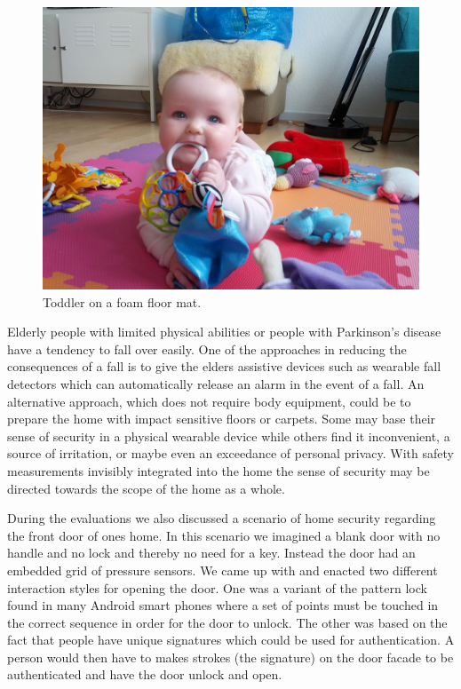 \begin{figure}[h]
  \centering
  \begin{minipage}[b]{.8\textwidth}
    \centering
    \includegraphics[width=.7\linewidth]{figures/touch/evaluation/softtiles}
  \caption[Toddler on a foam floor mat with puzzle-like tiles for extensibility.]
  {Toddler on a foam floor mat.}
  \label{fig:textiletouch:eval:softtiles}
  \end{minipage}
\end{figure}

Elderly people with limited physical abilities or people with Parkinson's disease have a tendency to fall over easily.
One of the approaches in reducing the consequences of a fall is to give the elders assistive devices such as wearable fall detectors which can automatically release an alarm in the event of a fall.
An alternative approach, which does not require body equipment, could be to prepare the home with impact sensitive floors or carpets.
Some may base their sense of security in a physical wearable device while others find it inconvenient, a source of irritation, or maybe even an exceedance of personal privacy. 
With safety measurements invisibly integrated into the home the sense of security may be directed towards the scope of the home as a whole.

During the evaluations we also discussed a scenario of home security regarding the front door of ones home.
In this scenario we imagined a blank door with no handle and no lock and thereby no need for a key.
Instead the door had an embedded grid of pressure sensors.
We came up with and enacted two different interaction styles for opening the door.
One was a variant of the pattern lock found in many Android smart phones where a set of points must be touched in the correct sequence in order for the door to unlock.
The other was based on the fact that people have unique signatures which could be used for authentication.
A person would then have to makes strokes (the signature) on the door facade to be authenticated and have the door unlock and open.

